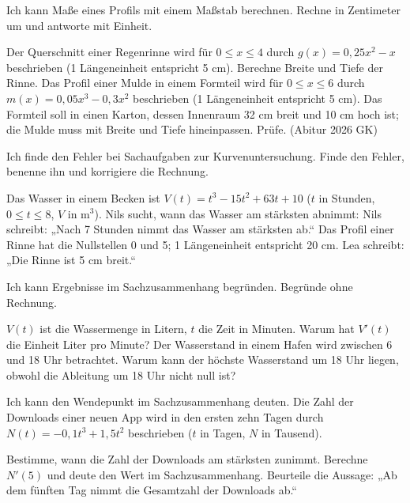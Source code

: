 \begin{aufgabe}{Ich kann Maße eines Profils mit einem Maßstab berechnen.}
Rechne in Zentimeter um und antworte mit Einheit.
\begin{teile}
\teil Der Querschnitt einer Regenrinne wird für $0 \le x \le 4$ durch $g(x) = 0{,}25x^2 - x$ beschrieben (1 Längeneinheit entspricht 5 cm). Berechne Breite und Tiefe der Rinne.
\teil Das Profil einer Mulde in einem Formteil wird für $0 \le x \le 6$ durch $m(x) = 0{,}05x^3 - 0{,}3x^2$ beschrieben (1 Längeneinheit entspricht 5 cm). Das Formteil soll in einen Karton, dessen Innenraum 32 cm breit und 10 cm hoch ist; die Mulde muss mit Breite und Tiefe hineinpassen. Prüfe. (Abitur 2026 GK)
\end{teile}
\end{aufgabe}

\begin{aufgabe}{Ich finde den Fehler bei Sachaufgaben zur Kurvenuntersuchung.}
Finde den Fehler, benenne ihn und korrigiere die Rechnung.
\begin{teile}
\teil Das Wasser in einem Becken ist $V(t) = t^3 - 15t^2 + 63t + 10$ ($t$ in Stunden, $0 \le t \le 8$, $V$ in m$^3$). Nils sucht, wann das Wasser am stärksten abnimmt:
Nils schreibt: „Nach 7 Stunden nimmt das Wasser am stärksten ab.“
\teil Das Profil einer Rinne hat die Nullstellen 0 und 5; 1 Längeneinheit entspricht 20 cm. Lea schreibt: „Die Rinne ist 5 cm breit.“
\end{teile}
\end{aufgabe}

\begin{aufgabe}{Ich kann Ergebnisse im Sachzusammenhang begründen.}
Begründe ohne Rechnung.
\begin{teile}
\teil $V(t)$ ist die Wassermenge in Litern, $t$ die Zeit in Minuten. Warum hat $V'(t)$ die Einheit Liter pro Minute?
\teil Der Wasserstand in einem Hafen wird zwischen 6 und 18 Uhr betrachtet. Warum kann der höchste Wasserstand um 18 Uhr liegen, obwohl die Ableitung um 18 Uhr nicht null ist?
\end{teile}
\end{aufgabe}

\begin{aufgabe}{Ich kann den Wendepunkt im Sachzusammenhang deuten.}
Die Zahl der Downloads einer neuen App wird in den ersten zehn Tagen durch $N(t) = -0{,}1t^3 + 1{,}5t^2$ beschrieben ($t$ in Tagen, $N$ in Tausend).
\begin{teile}
\teil Bestimme, wann die Zahl der Downloads am stärksten zunimmt.
\teil Berechne $N'(5)$ und deute den Wert im Sachzusammenhang.
\teil Beurteile die Aussage: „Ab dem fünften Tag nimmt die Gesamtzahl der Downloads ab.“
\end{teile}
\end{aufgabe}
